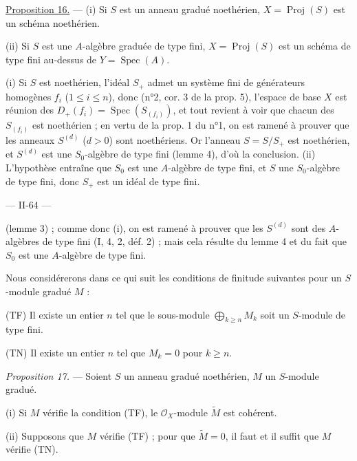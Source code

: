 \underline{Proposition 16.} — (i) Si $S$ est un anneau gradué noethérien, $X = \operatorname{Proj}(S)$ est un schéma noethérien.

(ii) Si $S$ est une $A$-algèbre graduée de type fini, $X = \operatorname{Proj}(S)$ est un schéma de type fini au-dessus de $Y = \operatorname{Spec}(A)$.

(i) Si $S$ est noethérien, l'idéal $S_+$ admet un système fini de générateurs homogènes $f_i$ ($1 \le i \le n$), donc (n°2, cor. 3 de la prop. 5), l'espace de base $X$ est réunion des $D_+(f_i) = \operatorname{Spec}(S_{(f_i)})$, et tout revient à voir que chacun des $S_{(f_i)}$ est noethérien ; en vertu de la prop. 1 du n°1, on est ramené à prouver que les anneaux $S^{(d)}$ ($d > 0$) sont noethériens. Or l'anneau $S = S/S_+$ est noethérien, et $S^{(d)}$ est une $S_0$-algèbre de type fini (lemme 4), d'où la conclusion.
(ii) L'hypothèse entraîne que $S_0$ est une $A$-algèbre de type fini, et $S$ une $S_0$-algèbre de type fini, donc $S_+$ est un idéal de type fini.

\newpage


— II-64 —

(lemme 3) ; comme donc (i), on est ramené à prouver que les $S^{(d)}$ sont des $A$-algèbres de type fini (I, 4, 2, déf. 2) ; mais cela résulte du lemme 4 et du fait que $S_0$ est une $A$-algèbre de type fini.

Nous considérerons dans ce qui suit les conditions de finitude suivantes pour un $S$-module gradué $M$ :

(TF) Il existe un entier $n$ tel que le sous-module $\bigoplus_{k \ge n} M_k$ soit un $S$-module de type fini.

(TN) Il existe un entier $n$ tel que $M_k = 0$ pour $k \ge n$.

\emph{Proposition 17.} — Soient $S$ un anneau gradué noethérien, $M$ un $S$-module gradué.

(i) Si $M$ vérifie la condition (TF), le $\mathcal{O}_X$-module $\widetilde{M}$ est cohérent.

(ii) Supposons que $M$ vérifie (TF) ; pour que $\widetilde{M} = 0$, il faut et il suffit que $M$ vérifie (TN).

